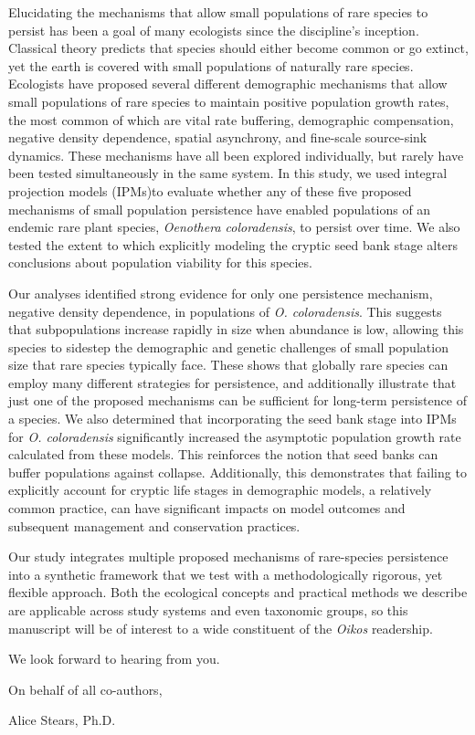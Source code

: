 \documentclass{article}
\begin{document}
Elucidating the mechanisms that allow small populations of rare species to persist has been a goal of many ecologists since the discipline's inception. Classical theory predicts that species should either become common or go extinct, yet the earth is covered with small populations of naturally rare species. Ecologists have proposed several different demographic mechanisms that allow small populations of rare species to maintain positive population growth rates, the most common of which are vital rate buffering, demographic compensation, negative density dependence, spatial asynchrony, and fine-scale source-sink dynamics. These mechanisms have all been explored individually, but rarely have been tested simultaneously in the same system. In this study, we used integral projection models (IPMs)to evaluate whether any of these five proposed mechanisms of small population persistence have enabled populations of an endemic rare plant species, \textit{Oenothera coloradensis}, to persist over time. We also tested the extent to which explicitly modeling the cryptic seed bank stage alters conclusions about population viability for this species.

Our analyses identified strong evidence for only one persistence mechanism, negative density dependence, in populations of \textit{O. coloradensis}. This suggests that subpopulations increase rapidly in size when abundance is low, allowing this species to sidestep the demographic and genetic challenges of small population size that rare species typically face. These shows that globally rare species can employ many different strategies for persistence, and additionally illustrate that just one of the proposed mechanisms can be sufficient for long-term persistence of a species. We also determined that incorporating the seed bank stage into IPMs for \textit{O. coloradensis} significantly increased the asymptotic population growth rate calculated from these models. This reinforces the notion that seed banks can buffer populations against collapse. Additionally, this demonstrates that failing to explicitly account for cryptic life stages in demographic models, a relatively common practice, can have significant impacts on model outcomes and subsequent management and conservation practices. 

Our study integrates multiple proposed mechanisms of rare-species persistence into a synthetic framework that we test with a methodologically rigorous, yet flexible approach. Both the ecological concepts and practical methods we describe are applicable across study systems and even taxonomic groups, so this manuscript will be of interest to a wide constituent of the \textit{Oikos} readership. 

We look forward to hearing from you.


\bigskip %

On behalf of all co-authors,

\bigskip %

Alice Stears, Ph.D.
\end{document}
